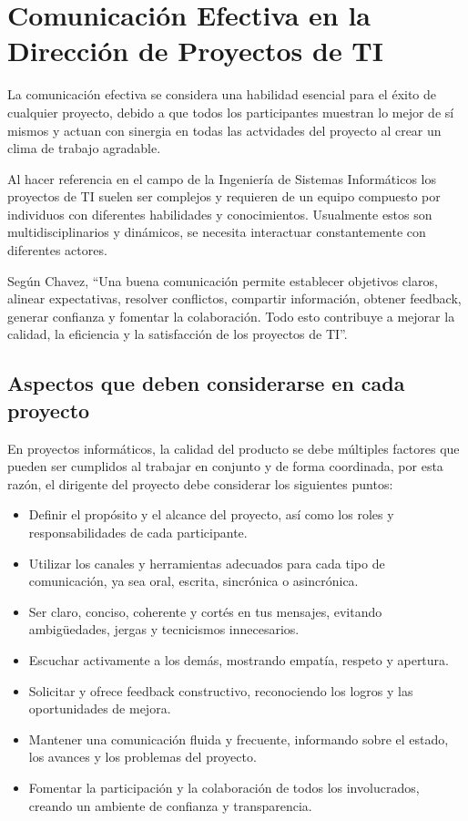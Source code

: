 \documentclass[journal]{IEEEtran}
\begin{document}
\section{Comunicación Efectiva en la Dirección de Proyectos de TI}
La comunicación efectiva se considera una habilidad esencial para el éxito de cualquier proyecto, debido a que todos los participantes muestran lo mejor de sí mismos y actuan con sinergia en todas las actvidades del proyecto al crear un clima de trabajo agradable. 

Al hacer referencia en el campo de la Ingeniería de Sistemas Informáticos los proyectos de TI suelen ser complejos y requieren de un equipo compuesto por individuos con diferentes habilidades y conocimientos. Usualmente estos son multidisciplinarios y dinámicos, se necesita interactuar constantemente con diferentes actores.

Según Chavez, “Una buena comunicación permite establecer objetivos claros, alinear expectativas, resolver conflictos, compartir información, obtener feedback, generar confianza y fomentar la colaboración. Todo esto contribuye a mejorar la calidad, la eficiencia y la satisfacción de los proyectos de TI”.

\subsection{Aspectos que deben considerarse en cada proyecto}
En proyectos informáticos, la calidad del producto se debe múltiples factores que pueden ser cumplidos al trabajar en conjunto y de forma coordinada, por esta razón, el dirigente del proyecto debe considerar los siguientes puntos:
\begin{itemize}
	\item Definir el propósito y el alcance del proyecto, así como los roles y responsabilidades de cada participante.
	\item Utilizar los canales y herramientas adecuados para cada tipo de comunicación, ya sea oral, escrita, sincrónica o asincrónica.
	\item Ser claro, conciso, coherente y cortés en tus mensajes, evitando ambigüedades, jergas y tecnicismos innecesarios.
	\item Escuchar activamente a los demás, mostrando empatía, respeto y apertura.
	\item Solicitar y ofrece feedback constructivo, reconociendo los logros y las oportunidades de mejora.
	\item Mantener una comunicación fluida y frecuente, informando sobre el estado, los avances y los problemas del proyecto.
	\item Fomentar la participación y la colaboración de todos los involucrados, creando un ambiente de confianza y transparencia.
\end{itemize}
\end{document}
